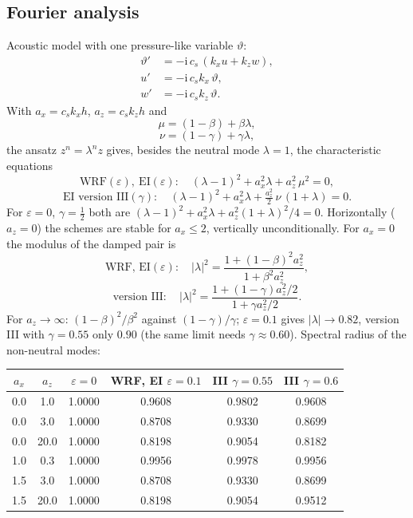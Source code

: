 \documentclass[11pt,a4paper]{article}
\newcommand{\tv}{\vartheta}   %
\begin{document}
\subsection{Fourier analysis}
Acoustic model with one pressure-like variable $\tv$:
\begin{align*}
\tv'&=-\mathrm i\,c_s\,(k_xu+k_zw),\\
u'&=-\mathrm i\,c_sk_x\,\tv,\\
w'&=-\mathrm i\,c_sk_z\,\tv .
\end{align*}
With $a_x=c_sk_xh$, $a_z=c_sk_zh$ and
\[
\mu=(1-\beta)+\beta\lambda ,
\]
\[
\nu=(1-\gamma)+\gamma\lambda ,
\]
the ansatz $z^n=\lambda^nz$ gives, besides the neutral mode $\lambda=1$, the characteristic equations
\[
\text{WRF}(\varepsilon),\ \text{EI}(\varepsilon):\quad(\lambda-1)^2+a_x^2\lambda+a_z^2\,\mu^2=0,
\]
\[
\text{EI version III}(\gamma):\quad(\lambda-1)^2+a_x^2\lambda+\tfrac{a_z^2}2\,\nu\,(1+\lambda)=0 .
\]
For $\varepsilon=0$, $\gamma=\tfrac12$ both are $(\lambda-1)^2+a_x^2\lambda+a_z^2(1+\lambda)^2/4=0$. Horizontally ($a_z=0$) the schemes are stable for
$a_x\le2$, vertically unconditionally. For $a_x=0$ the modulus of the damped pair is
\[
\text{WRF, EI}(\varepsilon):\quad|\lambda|^2=\frac{1+(1-\beta)^2a_z^2}{1+\beta^2a_z^2},
\]
\[
\text{version III}:\quad|\lambda|^2=\frac{1+(1-\gamma)a_z^2/2}{1+\gamma a_z^2/2} .
\]
For $a_z\to\infty$: $(1-\beta)^2/\beta^2$ against $(1-\gamma)/\gamma$; $\varepsilon=0.1$ gives $|\lambda|\to0.82$, version III with $\gamma=0.55$ only $0.90$
(the same limit needs $\gamma\approx0.60$). Spectral radius of the non-neutral modes:
\begin{center}\small
\begin{tabular}{cccccc}\toprule
$a_x$&$a_z$& $\varepsilon=0$ & WRF, EI $\varepsilon=0.1$ & III $\gamma=0.55$ & III $\gamma=0.6$\\\midrule
0.0 & 1.0 & 1.0000 & 0.9608 & 0.9802 & 0.9608\\
0.0 & 3.0 & 1.0000 & 0.8708 & 0.9330 & 0.8699\\
0.0 & 20.0 & 1.0000 & 0.8198 & 0.9054 & 0.8182\\
1.0 & 0.3 & 1.0000 & 0.9956 & 0.9978 & 0.9956\\
1.5 & 3.0 & 1.0000 & 0.8708 & 0.9330 & 0.8699\\
1.5 & 20.0 & 1.0000 & 0.8198 & 0.9054 & 0.9512\\\bottomrule
\end{tabular}
\end{center}

\end{document}
